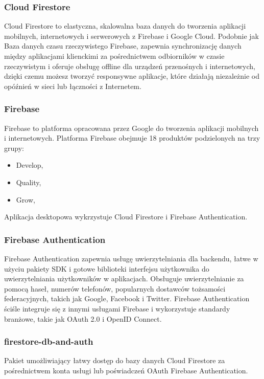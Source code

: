 \documentclass[12pt,a4paper]{article}
\begin{document}
		\subsubsection{Cloud Firestore}

					\indent	Cloud Firestore to elastyczna, skalowalna baza danych do tworzenia aplikacji mobilnych, internetowych i serwerowych z Firebase i Google Cloud.
					Podobnie jak Baza danych czasu rzeczywistego Firebase, zapewnia synchronizację danych między aplikacjami klienckimi za pośrednictwem odbiorników w czasie
					rzeczywistym i oferuje obsługę offline dla urządzeń przenośnych i internetowych, dzięki czemu możesz tworzyć responsywne aplikacje, które działają niezależnie
					od opóźnień w sieci lub łączności z Internetem.
				\subsubsection{Firebase}

					\indent Firebase to platforma opracowana przez Google do tworzenia aplikacji mobilnych i internetowych. Platforma Firebase obejmuje 18 produktów podzielonych
					na trzy grupy:
					\begin{itemize}
						\item Develop,
						\item Quality,
						\item Grow,
					\end{itemize}
					Aplikacja desktopowa wykrzystuje Cloud Firestore i Firebase Authentication.
				\subsubsection{Firebase Authentication}

					\indent	Firebase Authentication zapewnia usługę uwierzytelniania dla backendu, łatwe w użyciu pakiety SDK i gotowe biblioteki interfejsu użytkownika
					do uwierzytelniania użytkowników w aplikacjach. Obsługuje uwierzytelnianie za pomocą haseł, numerów telefonów, popularnych dostawców tożsamości
					federacyjnych, takich jak Google, Facebook i Twitter. Firebase Authentication ściśle integruje się z innymi usługami Firebase i wykorzystuje standardy
					branżowe, takie jak OAuth 2.0 i OpenID Connect.								
				\subsubsection{firestore-db-and-auth}

					\indent Pakiet umożliwiający łatwy dostęp do bazy danych Cloud Firestore za pośrednictwem konta usługi lub poświadczeń OAuth Firebase Authentication.
\end{document}
